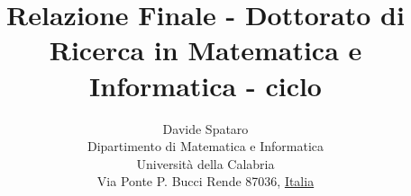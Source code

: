 \documentclass[a4paper,11pt]{paper}
\newcommand{\RNum}[1]{\uppercase\expandafter{\romannumeral #1\relax}}
\begin{document}
	\title{Relazione Finale - Dottorato di Ricerca in Matematica e
		Informatica - \RNum{30} ciclo}
	\author{
		Davide Spataro \\
		Dipartimento di Matematica e Informatica\\
		Università della Calabria\\
		Via Ponte P. Bucci Rende 87036, \underline{Italia}
	}
	
	
	
	\maketitle
	 

	
%
%
	\tableofcontents







	
\end{document}
